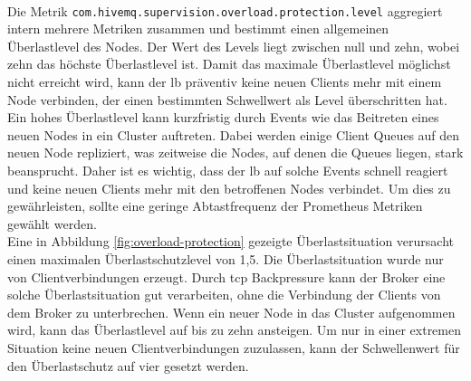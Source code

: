 \\
Die Metrik \verb|com.hivemq.supervision.overload.protection.level| aggregiert intern mehrere Metriken zusammen und bestimmt einen allgemeinen Überlastlevel des Nodes. Der Wert des Levels liegt zwischen null und zehn, wobei zehn das höchste Überlastlevel ist.
Damit das maximale Überlastlevel möglichst nicht erreicht wird, kann der \acl{lb} präventiv keine neuen Clients mehr mit einem Node verbinden, der einen bestimmten Schwellwert als Level überschritten hat.
\\
Ein hohes Überlastlevel kann kurzfristig durch Events wie das Beitreten eines neuen Nodes in ein Cluster auftreten. Dabei werden einige Client Queues auf den neuen Node repliziert, was zeitweise die Nodes, auf denen die Queues liegen, stark beansprucht. Daher ist es wichtig, dass der \ac{lb} auf solche Events schnell reagiert und keine neuen Clients mehr mit den betroffenen Nodes verbindet.
Um dies zu gewährleisten, sollte eine geringe Abtastfrequenz der Prometheus Metriken gewählt werden.
\\
Eine in Abbildung \ref{fig:overload-protection} gezeigte Überlastsituation verursacht einen maximalen Überlastschutzlevel von 1,5.
Die Überlastsituation wurde nur von Clientverbindungen erzeugt. Durch \ac{tcp} Backpressure kann der Broker eine solche Überlastsituation gut verarbeiten, ohne die Verbindung der Clients von dem Broker zu unterbrechen. Wenn ein neuer Node in das Cluster aufgenommen wird, kann das Überlastlevel auf bis zu zehn ansteigen. Um nur in einer extremen Situation keine neuen Clientverbindungen zuzulassen, kann der Schwellenwert für den Überlastschutz auf vier gesetzt werden.
\\
